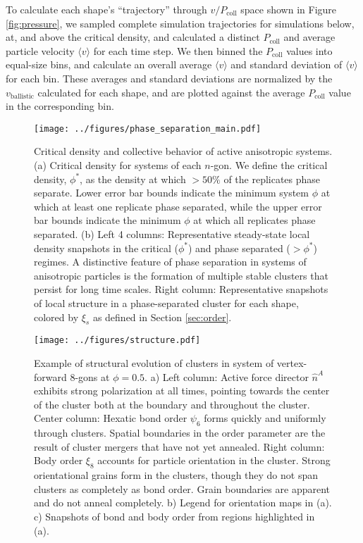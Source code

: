 To calculate each shape's ``trajectory'' through $v/P_\text{coll}$ space shown in Figure \ref{fig:pressure}, we sampled complete simulation trajectories for simulations below, at, and above the critical density, and calculated a distinct $P_\text{coll}$ and average particle velocity ${\langle}v{\rangle}$ for each time step.
We then binned the $P_\text{coll}$ values into equal-size bins, and calculate an overall average ${\langle}v{\rangle}$ and standard deviation of ${\langle}v{\rangle}$ for each bin.
These averages and standard deviations are normalized by the $v_\text{ballistic}$ calculated for each shape, and are plotted against the average $P_\text{coll}$ value in the corresponding bin.


\begin{figure}[T]
\begin{center}
\texttt{[image: ../figures/phase\_separation\_main.pdf]}
\caption{
Critical density and collective behavior of active anisotropic systems.
(a) Critical density for systems of each $n$-gon.
We define the critical density, $\phi^*$, as the density at which $>50\%$ of the replicates phase separate.
Lower error bar bounds indicate the minimum system $\phi$ at which at least one replicate phase separated, while the upper error bar bounds indicate the minimum $\phi$ at which all replicates phase separated.
(b) Left 4 columns: Representative steady-state local density snapshots in the critical ($\phi^*$) and phase separated ($>\phi^*$) regimes.
A distinctive feature of phase separation in systems of anisotropic particles is the formation of multiple stable clusters that persist for long time scales.
Right column: Representative snapshots of local structure in a phase-separated cluster for each shape, colored by $\xi_s$ as defined in Section \ref{sec:order}.
}
\label{fig:phase_diagram}
\end{center}
\end{figure}

\begin{figure}[t]
\begin{center}
\texttt{[image: ../figures/structure.pdf]}
\caption{
Example of structural evolution of clusters in system of vertex-forward 8-gons at $\phi=0.5$.
a) Left column: Active force director $\hat{n}^A$ exhibits strong polarization at all times, pointing towards the center of the cluster both at the boundary and throughout the cluster.
Center column: Hexatic bond order $\psi_6$ forms quickly and uniformly through clusters. Spatial boundaries in the order parameter are the result of cluster mergers that have not yet annealed.
Right column: Body order $\xi_8$ accounts for particle orientation in the cluster. Strong orientational grains form in the clusters, though they do not span clusters as completely as bond order. Grain boundaries are apparent and do not anneal completely.
b) Legend for orientation maps in (a).
c) Snapshots of bond and body order from regions highlighted in (a).
}
\label{fig:structure}
\end{center}
\end{figure}

